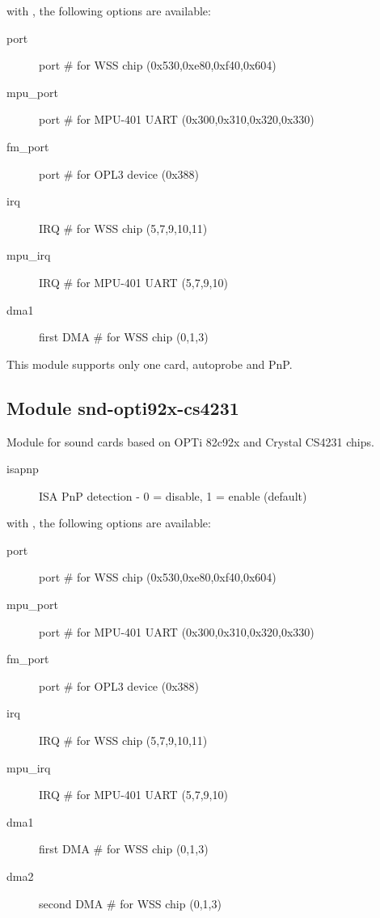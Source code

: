 \documentclass[a4paper,8pt,english]{sphinxmanual}
\begin{document}
with , the following options are available:
\begin{description}
\item[{port}] \leavevmode
port \# for WSS chip (0x530,0xe80,0xf40,0x604)

\item[{mpu\_port}] \leavevmode
port \# for MPU-401 UART (0x300,0x310,0x320,0x330)

\item[{fm\_port}] \leavevmode
port \# for OPL3 device (0x388)

\item[{irq}] \leavevmode
IRQ \# for WSS chip (5,7,9,10,11)

\item[{mpu\_irq}] \leavevmode
IRQ \# for MPU-401 UART (5,7,9,10)

\item[{dma1}] \leavevmode
first DMA \# for WSS chip (0,1,3)

\end{description}

This module supports only one card, autoprobe and PnP.


\subsection{Module snd-opti92x-cs4231}
\label{sound/alsa-configuration:module-snd-opti92x-cs4231}
Module for sound cards based on OPTi 82c92x and Crystal CS4231 chips.
\begin{description}
\item[{isapnp}] \leavevmode
ISA PnP detection - 0 = disable, 1 = enable (default)

\end{description}

with , the following options are available:
\begin{description}
\item[{port}] \leavevmode
port \# for WSS chip (0x530,0xe80,0xf40,0x604)

\item[{mpu\_port}] \leavevmode
port \# for MPU-401 UART (0x300,0x310,0x320,0x330)

\item[{fm\_port}] \leavevmode
port \# for OPL3 device (0x388)

\item[{irq}] \leavevmode
IRQ \# for WSS chip (5,7,9,10,11)

\item[{mpu\_irq}] \leavevmode
IRQ \# for MPU-401 UART (5,7,9,10)

\item[{dma1}] \leavevmode
first DMA \# for WSS chip (0,1,3)

\item[{dma2}] \leavevmode
second DMA \# for WSS chip (0,1,3)

\end{description}
\end{document}
